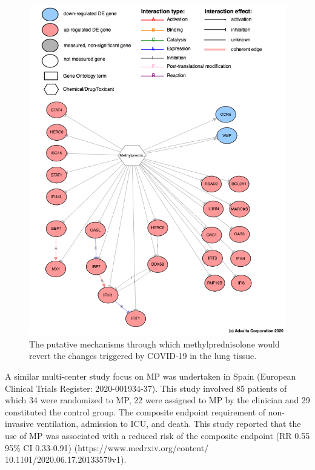 \begin{figure}
\centering
	\includegraphics[width=0.8\linewidth]{../Figures/Methylprednisolone_mechanism.png}
        \caption{The putative mechanisms through which methylprednisolone  would revert the  changes triggered by COVID-19  in the lung tissue.}
        \label{both_mechanisms}
\end{figure}

A similar multi-center study focus on MP was undertaken in Spain (European Clinical Trials Register: 2020-001934-37). This study involved 85 patients of which 34 were randomized to MP, 22 were assigned to MP by the clinician and 29 constituted the control group. The composite endpoint requirement of non-invasive ventilation, admission to ICU, and death. This study reported that the use of MP was associated with a reduced risk of the composite endpoint  (RR 0.55 95\% CI 0.33-0.91) ({https://www.medrxiv.org/content/\\10.1101/2020.06.17.20133579v1}).

